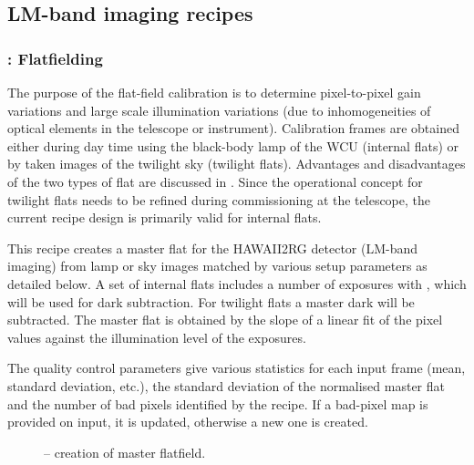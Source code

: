 
\subsection{LM-band imaging recipes}
\label{ssec:recipes_img_lm}
\subsubsection{:  Flatfielding}
\label{lm_img_flatfield}
\label{rec:lm_img_flatfield}
\label{sssec:lm_img_flatfield}
\label{metis_lm_img_flat}
\label{rec:metis_lm_img_flat}
\label{sssec:metis_lm_img_flat}

The purpose of the flat-field calibration is to determine
pixel-to-pixel gain variations and large scale illumination variations
(due to inhomogeneities of optical elements in the telescope or
instrument). Calibration frames are obtained either during day time
using the black-body lamp of the \ac{WCU} (internal flats) or by taken
images of the twilight sky (twilight flats). Advantages and
disadvantages of the two types of flat are discussed in
\cite{METIS-calibration_plan}. Since the operational concept for
twilight flats needs to be refined during commissioning at the
telescope, the current recipe design is primarily valid for internal
flats.

This recipe creates a master flat for the HAWAII2RG detector (LM-band
imaging) from lamp or sky images matched by various setup parameters
as detailed below.  A set of internal flats includes a number of
exposures with , which will be used for dark
subtraction. For twilight flats a master dark will be subtracted. The
master flat is obtained by the slope of a linear fit of the pixel
values against the illumination level of the exposures.

The quality control parameters give various statistics for each input
frame (mean, standard deviation, etc.), the standard deviation of the
normalised master flat and the number of bad pixels identified by the
recipe. If a bad-pixel map is provided on input, it is updated,
otherwise a new one is created.



\begin{figure}[hb]
  \centering
    \def \globalscale {0.700000}
    \fontsize{10}{12}\selectfont
    
  \caption[Recipe: ]{ --
    creation of  master flatfield.}
  \label{fig:metis_lm_img_flat}
\end{figure}

